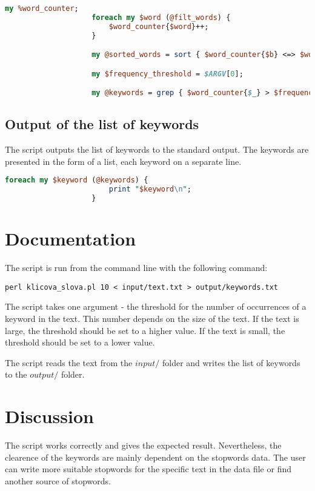 \documentclass[a4paper,11pt]{article}
\begin{document}
    \newpage
    \begin{minipage}[t]{0.5\textwidth} 
                \begin{lstlisting}[language=Perl]
                    my %word_counter;
                    foreach my $word (@filt_words) {
                        $word_counter{$word}++;
                    }

                    my @sorted_words = sort { $word_counter{$b} <=> $word_counter{$a} } keys %word_counter;

                    my $frequency_threshold = $ARGV[0]; 

                    my @keywords = grep { $word_counter{$_} > $frequency_threshold } @sorted_words;
                \end{lstlisting}

            \subsection{Output of the list of keywords}
                The script outputs the list of keywords to the standard output. The keywords are presented in the form of a list, each keyword on a separate line.
                \begin{lstlisting}[language=Perl]
                    foreach my $keyword (@keywords) {
                        print "$keyword\n";
                    }
                \end{lstlisting}
    \end{minipage}
    \hspace{10pt}
    \begin{minipage}[t]{0.5\textwidth} 
        \section{Documentation}
            The script is run from the command line with the following command:
            \begin{center}
                \texttt{perl klicova\_slova.pl 10 < input/text.txt > output/keywords.txt}
            \end{center}
            The script takes one argument - the threshold for the number of occurrences of a keyword in the text. This number depends on the size of the text. If the text is large, the threshold should be set to a higher value. If the text is small, the threshold should be set to a lower value.
            \par The script reads the text from the $input/$ folder and writes the list of keywords to the $output/$ folder.

        \section{Discussion}
            The script works correctly and gives the expected result. Nevertheless, the clearence of the keywords are mainly dependent on the stopwords data. The user can write more suitable stopwords for the specific text in the data file or find another source of stopwords.
    \end{minipage}
\end{document}
